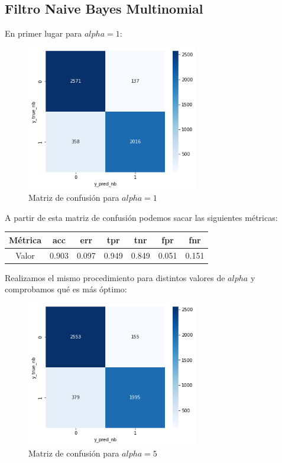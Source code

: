 \documentclass[conference,a4paper]{IEEEtran}
\begin{document}
\subsection{Filtro Naive Bayes Multinomial}
En primer lugar para $alpha=1$: \\

\begin{figure}[h]
  \centering
  \includegraphics[width=75mm]{nb_1}
  \caption{Matriz de confusión para $alpha=1$}
  \label{fig:ejemplo}
\end{figure}

A partir de esta matriz de confusión podemos sacar las siguientes métricas:

\begin{center}
\begin{tabular}[h]{ |c|c|c|c|c|c|c| } 
 \hline
 Métrica & acc & err & tpr & tnr & fpr & fnr \\ 
 \hline
 Valor & 0.903 & 0.097 & 0.949 & 0.849 & 0.051 & 0.151 \\ 
 \hline
\end{tabular}
\end{center}

Realizamos el mismo procedimiento para distintos valores de $alpha$ y comprobamos qué es más óptimo:\\

\begin{figure}[h]
  \centering
  \includegraphics[width=75mm]{nb_5}
  \caption{Matriz de confusión para $alpha=5$}
  \label{fig:ejemplo}
\end{figure}
\end{document}
